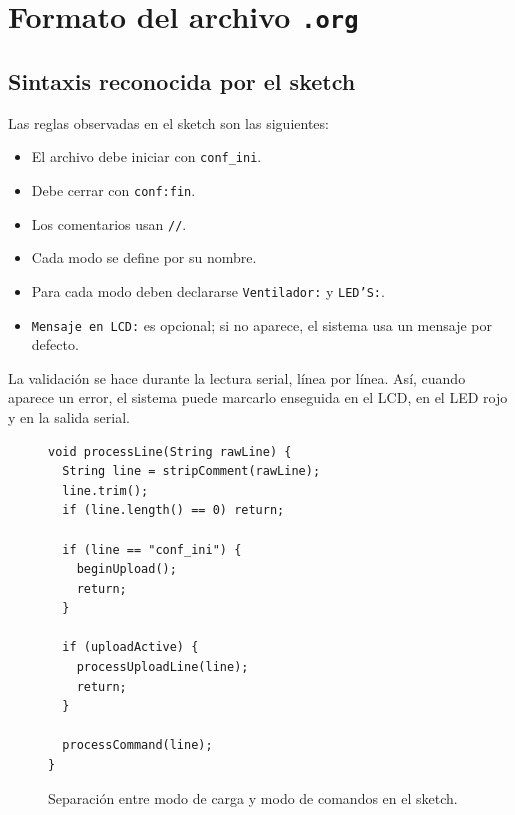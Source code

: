 \documentclass[12pt,a4paper]{article}
\begin{document}
\section{Formato del archivo \texttt{.org}}

\subsection{Sintaxis reconocida por el sketch}
Las reglas observadas en el sketch son las siguientes:
\begin{itemize}[leftmargin=1.2cm]
    \item El archivo debe iniciar con \texttt{conf\_ini}.
    \item Debe cerrar con \texttt{conf:fin}.
    \item Los comentarios usan \texttt{//}.
    \item Cada modo se define por su nombre.
    \item Para cada modo deben declararse \texttt{Ventilador:} y \texttt{LED'S:}.
    \item \texttt{Mensaje en LCD:} es opcional; si no aparece, el sistema usa un mensaje por defecto.
\end{itemize}

La validación se hace durante la lectura serial, línea por línea. Así, cuando aparece un error, el sistema puede marcarlo enseguida en el LCD, en el LED rojo y en la salida serial.

\begin{figure}[H]
    \centering
    \begin{minipage}{0.9\textwidth}
        \begin{lstlisting}[basicstyle=\ttfamily\footnotesize]
void processLine(String rawLine) {
  String line = stripComment(rawLine);
  line.trim();
  if (line.length() == 0) return;

  if (line == "conf_ini") {
    beginUpload();
    return;
  }

  if (uploadActive) {
    processUploadLine(line);
    return;
  }

  processCommand(line);
}
        \end{lstlisting}
    \end{minipage}
    \caption{Separación entre modo de carga y modo de comandos en el sketch.}
\end{figure}
\end{document}
